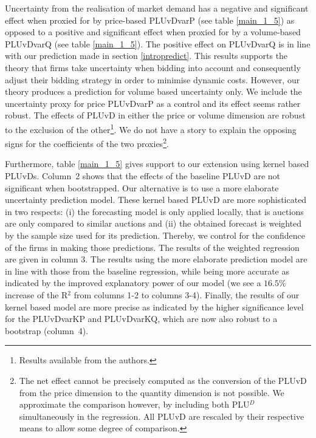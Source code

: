 Uncertainty from the realisation of market demand has a negative and significant effect when proxied for by price-based PLUvDvarP (see table \ref{main_1_5}) as opposed to a positive and significant effect when proxied for by a volume-based PLUvDvarQ (see table \ref{main_1_5}). 
The positive effect on PLUvDvarQ is in line with our prediction made in section \ref{intropredict}. This results supports the theory that firms take uncertainty when bidding into account and consequently adjust their bidding strategy in order to minimise dynamic costs.
However, our theory produces a prediction for volume based uncertainty only. We include the uncertainty proxy for price PLUvDvarP as a control and its effect seems rather robust. The effects of PLUvD in either the price or volume dimension are robust to the exclusion of the other\footnote{Results available from the authors.}. We do not have a story to explain the opposing signs for the coefficients of the two proxies\footnote{The net effect cannot be precisely computed as the conversion of the PLUvD from the price dimension to the quantity dimension is not possible. We approximate the comparison however, by including both PLU$^{D}$ simultaneously in the regression. All PLUvD are rescaled by their respective means to allow some degree of comparison.}. 

Furthermore, table \ref{main_1_5} gives support to our extension using kernel based PLUvDs. Column~2 shows that the effects of the baseline PLUvD are not significant when bootstrapped. Our alternative is to use a more elaborate uncertainty prediction model.  These kernel based PLUvD are more sophisticated in two respects: (i) the forecasting model is only applied locally, that is auctions are only compared to similar auctions and (ii) the obtained forecast is weighted by the sample size used for its prediction. Thereby, we control for the confidence of the firms in making those predictions. The results of the weighted regression are given in column 3. The results using the more elaborate prediction model are
in line with those from the baseline regression, while being more accurate as indicated by the improved explanatory power of our model (we see a $16.5\%$ increase of the R$^2$ from columns 1-2 to columns 3-4). Finally, the results of our kernel based model are more precise as indicated by the higher significance level for the PLUvDvarKP and PLUvDvarKQ, which are now also robust to a bootstrap (column~4).




